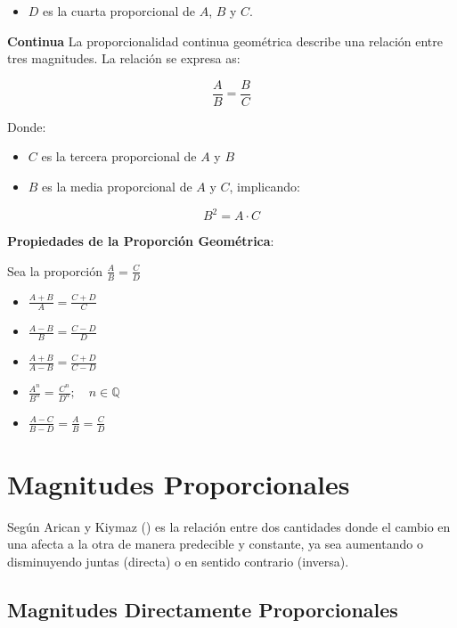 \documentclass[
  stu,
  floatsintext,
  longtable,
  a4paper,
  nolmodern,
  notxfonts,
  notimes,
  12pt,
  colorlinks=true,linkcolor=blue,citecolor=blue,urlcolor=blue]{apa7}
\providecommand{\tightlist}{%
  \setlength{\itemsep}{0pt}\setlength{\parskip}{0pt}}
\begin{document}
\begin{itemize}
\tightlist
\item
  \(D\) es la cuarta proporcional de \(A\), \(B\) y \(C\).
\end{itemize}

\textbf{Continua} La proporcionalidad continua geométrica describe una
relación entre tres magnitudes. La relación se expresa as:

\[
\frac{A}{B} = \frac{B}{C}
\]

Donde:

\begin{itemize}
\item
  \(C\) es la tercera proporcional de \(A\) y \(B\)
\item
  \(B\) es la media proporcional de \(A\) y \(C\), implicando:
\end{itemize}

\[
B^2 = A \cdot C
\]

\textbf{Propiedades de la Proporción Geométrica}:

Sea la proporción \(\frac{A}{B} = \frac{C}{D}\)

\begin{itemize}
\item
  \(\frac{A+B}{A} = \frac{C+D}{C}\)
\item
  \(\frac{A-B}{B} = \frac{C-D}{D}\)
\item
  \(\frac{A+B}{A-B} = \frac{C+D}{C-D}\)
\item
  \(\frac{A^n}{B^n} = \frac{C^n}{D^n} ; \quad n \in \mathbb{Q}\)
\item
  \(\frac{A-C}{B-D} = \frac{A}{B} = \frac{C}{D}\)
\end{itemize}

\section{Magnitudes Proporcionales}\label{magnitudes-proporcionales}

Según Arican y Kiymaz
() es
la relación entre dos cantidades donde el cambio en una afecta a la otra
de manera predecible y constante, ya sea aumentando o disminuyendo
juntas (directa) o en sentido contrario (inversa).

\subsection{Magnitudes Directamente
Proporcionales}\label{magnitudes-directamente-proporcionales}
\end{document}

